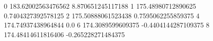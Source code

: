 0 183.62002563476562 8.870651245117188
1 175.48980712890625 0.7404327392578125
2 175.50888061523438 0.7595062255859375
4 174.74937438964844 0.0
6 174.3089599609375 -0.4404144287109375
8 174.48414611816406 -0.265228271484375
